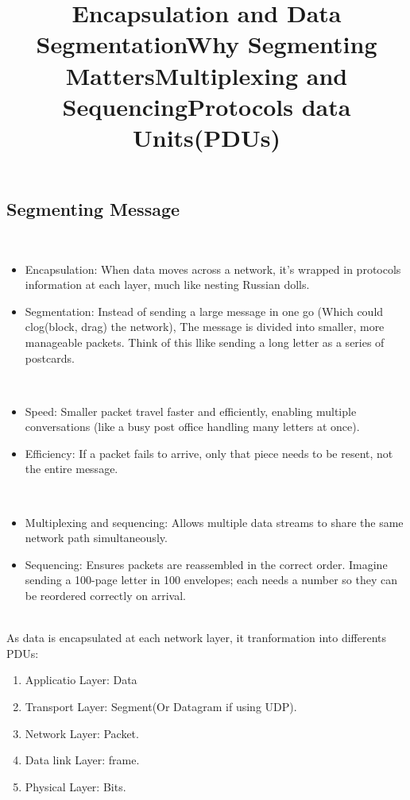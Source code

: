 \documentclass[a4paper,11pt]{article}
\begin{document}
\subsection{Segmenting Message}
\title{Encapsulation and Data Segmentation}\\
\begin{itemize}
    \item Encapsulation: When data moves across a network, it's wrapped in protocols information at each layer, much like nesting Russian dolls.\\
    \item Segmentation: Instead of sending a large message in one go (Which could clog(block, drag) the network), The message is divided into smaller, more manageable packets. Think of this llike sending a long letter as a series of postcards.\\
\end{itemize}

\title{Why Segmenting Matters}\\
\begin{itemize}
    \item Speed: Smaller packet travel faster and efficiently, enabling multiple conversations (like a busy post office handling many letters at once).\\
    \item Efficiency: If a packet fails to arrive, only that piece needs to be resent, not the entire message.\\
\end{itemize}

\title{Multiplexing and Sequencing}\\
\begin{itemize}
    \item Multiplexing and sequencing: Allows multiple data streams to share the same network path simultaneously.\\
    \item Sequencing: Ensures packets are reassembled in the correct order. Imagine sending a 100-page letter in 100 envelopes; each needs a number so they can be reordered correctly on arrival.\\
\end{itemize}

\title{Protocols data Units(PDUs)}\\
As data is encapsulated at each network layer, it tranformation into differents PDUs:\\
\begin{enumerate}
    \item Applicatio Layer: Data\\
    \item Transport Layer: Segment(Or Datagram if using UDP).\\
    \item Network Layer: Packet.\\
    \item Data link Layer: frame.\\
    \item Physical Layer: Bits.\\
\end{enumerate}
\end{document}
